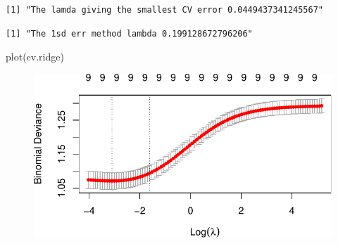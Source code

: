 \documentclass[
  letterpaper,
  DIV=11,
  numbers=noendperiod]{scrartcl}
\newenvironment{Shaded}{\begin{snugshade}}{\end{snugshade}}
\newcommand{\AttributeTok}[1]{\textcolor[rgb]{0.40,0.45,0.13}{#1}}
\newcommand{\CommentTok}[1]{\textcolor[rgb]{0.37,0.37,0.37}{#1}}
\newcommand{\ConstantTok}[1]{\textcolor[rgb]{0.56,0.35,0.01}{#1}}
\newcommand{\FloatTok}[1]{\textcolor[rgb]{0.68,0.00,0.00}{#1}}
\newcommand{\FunctionTok}[1]{\textcolor[rgb]{0.28,0.35,0.67}{#1}}
\newcommand{\NormalTok}[1]{\textcolor[rgb]{0.00,0.23,0.31}{#1}}
\newcommand{\SpecialCharTok}[1]{\textcolor[rgb]{0.37,0.37,0.37}{#1}}
\newcommand{\StringTok}[1]{\textcolor[rgb]{0.13,0.47,0.30}{#1}}
\begin{document}
\begin{verbatim}
[1] "The lamda giving the smallest CV error 0.0449437341245567"
\end{verbatim}

\begin{Shaded}
\end{Shaded}

\begin{verbatim}
[1] "The 1sd err method lambda 0.199128672796206"
\end{verbatim}

\begin{Shaded}
\begin{Highlighting}[]
\FunctionTok{plot}\NormalTok{(cv.ridge)}
\end{Highlighting}
\end{Shaded}

\begin{figure}[H]

{\centering \includegraphics{L10_files/figure-pdf/unnamed-chunk-8-2.pdf}

}

\end{figure}

\begin{Shaded}
\end{Shaded}
\end{document}
